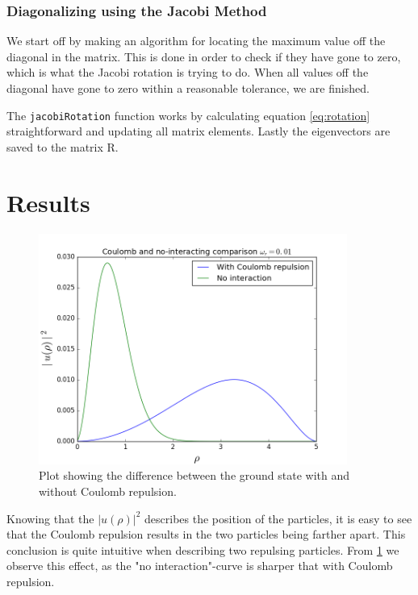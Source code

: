 \documentclass[10pt, a4paper]{amsart}
\begin{document}
\subsubsection{Diagonalizing using the Jacobi Method} We start off by making an algorithm for locating the maximum value off the diagonal in the matrix. This is done in order to check if they have gone to zero, which is what the Jacobi rotation is trying to do. When all values off the diagonal have gone to zero within a reasonable tolerance, we are finished. 

The \texttt{jacobiRotation} function works by calculating equation \ref{eq:rotation} straightforward and updating all matrix elements. Lastly the eigenvectors are saved to the matrix R.

\section{Results}

\begin{figure}[ht]
	\label{fig:ConoCo}
	\centering
	\includegraphics[width=0.9\textwidth]{../figures/interaction.png}
	\caption{Plot showing the difference between the ground state with and without Coulomb repulsion.}
\end{figure}

Knowing that the $|u(\rho)|^2$ describes the position of the particles, it is easy to see that the Coulomb repulsion results in the two particles being farther apart. This conclusion is quite intuitive when describing two repulsing particles. From \ref{fig:ConoCo} we observe this effect, as the "no interaction"-curve is sharper that with Coulomb repulsion.
\end{document}
